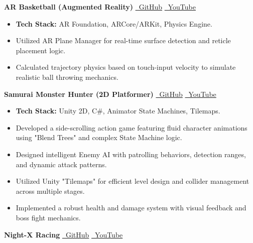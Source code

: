 \documentclass[10pt, letterpaper]{article}
\newenvironment{highlights}{
    \begin{itemize}[topsep=0.05cm, parsep=0.05cm, itemsep=0pt, leftmargin=10pt]
}{
    \end{itemize}
}
\begin{document}
\vspace{0.3cm}
\begin{twocolentry}{
    \textbf{AR Basketball (Augmented Reality)}
}
    \hfill  
    \href{https://github.com/hashiq-11/AR-Basket-ball-game}{\faGithub~GitHub} \quad
    \href{https://youtube.com/shorts/IAIEPog__fE?si=Z0unXqEmVnMGFM-h}{\faYoutube~YouTube}
\end{twocolentry}

\vspace{0.1 cm}
\begin{onecolentry}
    \begin{highlights}
        \item \textbf{Tech Stack:} AR Foundation, ARCore/ARKit, Physics Engine.
        \item Utilized AR Plane Manager for real-time surface detection and reticle placement logic.
        \item Calculated trajectory physics based on touch-input velocity to simulate realistic ball throwing mechanics.
    \end{highlights}
\end{onecolentry}
\vspace{0.3cm}
\begin{twocolentry}{
    \textbf{Samurai Monster Hunter (2D Platformer)}
}
    \hfill  
    \href{https://github.com/hashiq-11/Semurai_2D}{\faGithub~GitHub} \quad
    \href{https://youtu.be/WdRFa_cf5IE}{\faYoutube~YouTube}
\end{twocolentry}

\vspace{0.1 cm}

\begin{onecolentry}
    \begin{highlights}
        \item \textbf{Tech Stack:} Unity 2D, C\#, Animator State Machines, Tilemaps.
        \item Developed a side-scrolling action game featuring fluid character animations using "Blend Trees" and complex State Machine logic.
        \item Designed intelligent Enemy AI with patrolling behaviors, detection ranges, and dynamic attack patterns.
        \item Utilized Unity "Tilemaps" for efficient level design and collider management across multiple stages.
        \item Implemented a robust health and damage system with visual feedback and boss fight mechanics.
    \end{highlights}
    
\end{onecolentry}
\vspace{0.3cm}
\begin{twocolentry}{
    \textbf{Night-X Racing}
}
    \hfill  
    \href{https://github.com/hashiq-11/git-car-game}{\faGithub~GitHub} \quad
    \href{https://youtu.be/cGqEKhxJZwg}{\faYoutube~YouTube}
\end{twocolentry}
\end{document}
